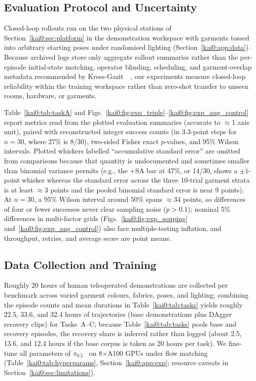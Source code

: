 \subsection{Evaluation Protocol and Uncertainty}\label{kai0:sec:protocol}
Closed-loop rollouts run on the two physical stations of Section~\ref{kai0:sec:platform} in the demonstration workspace with garments tossed into arbitrary starting poses under randomised lighting (Section~\ref{kai0:app:data}). Because archived logs store only aggregate rollout summaries rather than the per-episode initial-state matching, operator blinding, scheduling, and garment-overlap metadata recommended by Kress-Gazit~\etal~\cite{kressgazit2024robot}, our experiments measure closed-loop reliability within the training workspace rather than zero-shot transfer to unseen rooms, hardware, or garments.

Table~\ref{kai0:tab:taskA} and Figs.~\ref{kai0:fig:exp_triple}--\ref{kai0:fig:exp_aug_control} report metrics read from the plotted evaluation summaries (accurate to $\approx$1 axis unit), paired with reconstructed integer success counts (in 3.3-point steps for $n = 30$, where 27\% is 8/30), two-sided Fisher exact $p$-values, and 95\% Wilson intervals. Plotted whiskers labelled ``accumulative standard error'' are omitted from comparisons because that quantity is undocumented and sometimes smaller than binomial variance permits (e.g., the +SA bar at 47\%, or 14/30, shows a $\pm 1$-point whisker whereas the standard error across the three 10-trial garment strata is at least $\approx$3 points and the pooled binomial standard error is near 9 points). At $n = 30$, a 95\% Wilson interval around 50\% spans $\approx$34 points, so differences of four or fewer successes never clear sampling noise ($p > 0.1$); nominal 5\% differences in multi-factor grids (Figs.~\ref{kai0:fig:exp_souping} and~\ref{kai0:fig:exp_aug_control}) also face multiple-testing inflation, and throughput, retries, and average score are point means.

\subsection{Data Collection and Training}\label{kai0:sec:data}
Roughly 20 hours of human teleoperated demonstrations are collected per benchmark across varied garment colours, fabrics, poses, and lighting; combining the episode counts and mean durations in Table~\ref{kai0:tab:tasks} yields roughly 22.5, 33.6, and 32.4 hours of trajectories (base demonstrations plus DAgger recovery clips) for Tasks~A--C; because Table~\ref{kai0:tab:tasks} pools base and recovery episodes, the recovery share is inferred rather than logged (about 2.5, 13.6, and 12.4 hours if the base corpus is taken as 20 hours per task). We fine-tune all parameters of $\pi_{0.5}$~\cite{black2025pi05} on 8$\times$A100 GPUs under flow matching~\cite{black2024pi0} (Table~\ref{kai0:tab:hyperparams}, Section~\ref{kai0:app:exp}; resource caveats in Section~\ref{kai0:sec:limitations}).

